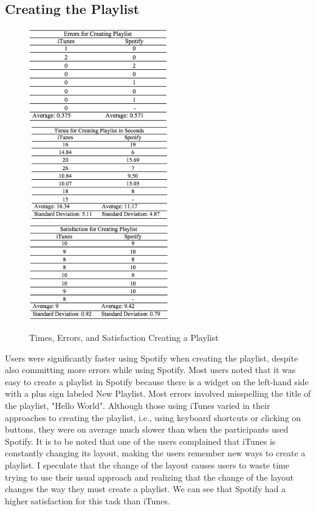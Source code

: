 \documentclass[11pt]{article}
\begin{document}
\subsection{Creating the Playlist}

\begin{figure}[H] %
   \centering
   \includegraphics[width=2.4in]{errors_playlist.png}       
   \includegraphics[width=2.4in]{times_playlist.png} 
   \includegraphics[width=2.4in]{satisfaction_playlist.png} 
   \caption{Times, Errors, and Satisfaction Creating a Playlist}
   \label{fig:playlist}
\end{figure}

Users were significantly faster using Spotify when creating the playlist, despite also committing more errors while using Spotify. Most users noted  that it was easy to create a playlist in Spotify because there is a widget on the left-hand side with a plus sign labeled New Playlist. Most errors involved misspelling the title of the playlist, "Hello World". Although those using iTunes varied in their approaches to creating the playlist, i.e., using keyboard shortcuts or clicking on buttons, they were on average much slower than when the participants used Spotify. It is to be noted that one of the users complained that iTunes is constantly changing its layout, making the users remember new ways to create a playlist. I speculate that the change of the layout causes users to waste time trying to use their usual approach and realizing that the change of the layout changes the way they must create a playlist. We can see that Spotify had a higher satisfaction for this task than iTunes. 
\end{document}
